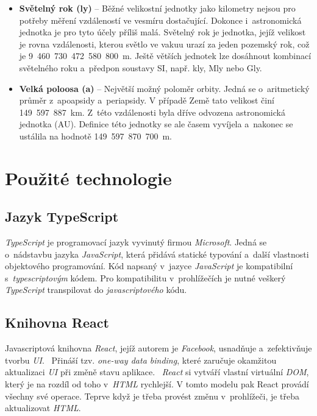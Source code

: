 \documentclass[a4paper,12pt]{article}
\begin{document}
\begin{itemize}
\item \textbf{Světelný rok (ly)} -- Běžné velikostní jednotky jako kilometry nejsou pro potřeby měření vzdáleností ve vesmíru dostačující. Dokonce i~astronomická jednotka je pro tyto účely příliš malá. Světelný rok je jednotka, jejíž velikost je rovna vzdálenosti, kterou světlo ve vakuu urazí za jeden pozemský rok, což je 9~460~730~472~580~800~m. Ještě větších jednotek lze dosáhnout kombinací světelného roku a~předpon soustavy SI, např. kly, Mly nebo Gly.~\cite{kleczek}

\item \textbf{Velká poloosa (a)} -- Největší možný poloměr orbity. Jedná se o~aritmetický průměr z~apoapsidy a~periapsidy. V případě Země tato velikost činí 149~597~887~km. Z~této vzdálenosti byla dříve odvozena astronomická jednotka (AU). Definice této jednotky se ale časem vyvíjela a~nakonec se ustálila na hodnotě 149~597~870~700~m.~\cite{kleczek}
\end{itemize}

\section{Použité technologie}

\subsection{Jazyk TypeScript}

\textit{TypeScript} je programovací jazyk vyvinutý firmou \textit{Microsoft}. Jedná se o~nádstavbu jazyka \textit{JavaScript}, která přidává statické typování a~další vlastnosti objektového programování. Kód napsaný v~jazyce \textit{JavaScript} je kompatibilní s~\textit{typescriptovým} kódem. Pro kompatibilitu v~prohlížečích je nutné veškerý \textit{TypeScript} transpilovat do \textit{javascriptového} kódu.~\cite{typescript}

\subsection{Knihovna React}

Javascriptová knihovna \textit{React}, jejíž autorem je \textit{Facebook}, usnadňuje a~zefektivňuje tvorbu \textit{UI}.~\cite{reactbook} Přináší tzv. \textit{one-way data binding}, které zaručuje okamžitou aktualizaci \textit{UI} při změně stavu aplikace.~\cite{onewaydatabinding} \textit{React} si vytváří vlastní virtuální \textit{DOM}, který je na rozdíl od toho v~\textit{HTML} rychlejší. V tomto modelu pak React provádí všechny své operace. Teprve když je třeba provést změnu v~prohlížeči, je třeba  aktualizovat \textit{HTML}.~\cite{reactbook}
\end{document}
